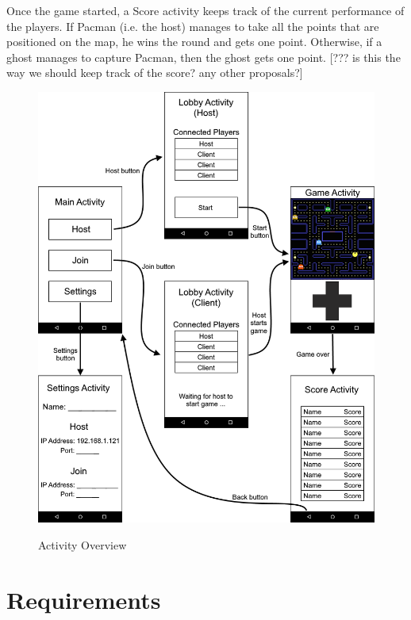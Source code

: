 \documentclass{report}
\newcommand{\lfig}[1]{\label{fig:#1}}
\begin{document}
Once the game started, a Score activity keeps track of the current performance of the players. 
If Pacman (i.e. the host) manages to take all the points that are positioned on the map, he wins the round and gets one point. 
Otherwise, if a ghost manages to capture Pacman, then the ghost gets one point. 
[??? is this the way we should keep track of the score? any other proposals?]

\begin{figure} [ht!]
	\centering
    \includegraphics[width=\columnwidth]{overview.png}
    \lfig{activity-overview}
    \vspace{-5mm} %
	\caption{Activity Overview}
\end{figure}

\section{Requirements}

\end{document}
